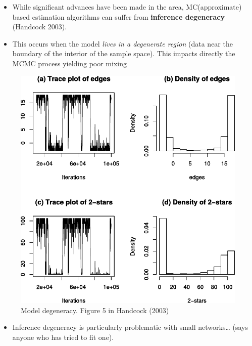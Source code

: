 \documentclass[10pt,ignorenonframetext,aspectratio=169,]{beamer}
\providecommand{\tightlist}{%
  \setlength{\itemsep}{0pt}\setlength{\parskip}{0pt}}
\begin{document}
\begin{frame}

\footnotesize

\begin{itemize}
\item
  While significant advances have been made in the area, MC(approximate)
  based estimation algorithms can suffer from
  \textbf{inference degeneracy} (Handcock 2003).\pause
\item
  This occurs when the model \textit{lives in a degenerate region} (data
  near the boundary of the interior of the sample space). This impacts
  directly the MCMC process yielding poor mixing\pause
\end{itemize}

\begin{figure}
\centering
\includegraphics[height=.6\textheight]{handcock2003-figure5.pdf}
\caption{Model degeneracy. Figure 5 in Handcock (2003)}
\end{figure}\pause

\begin{itemize}
\tightlist
\item
  Inference degeneracy is particularly problematic with small
  networks\ldots{} (says anyone who has tried to fit one).
\end{itemize}

\normalsize

\end{frame}
\end{document}
